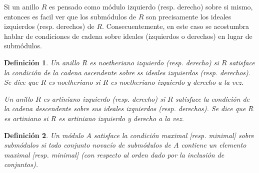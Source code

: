 \documentclass{report}
\newtheorem{definition}{Definición}
\begin{document}
  Si un anillo \(R\) es pensado como módulo izquierdo (resp. derecho) sobre si mismo, entonces es facil ver que los submódulos de \(R\) son precisamente los ideales izquierdos (resp. derechos) de \(R\).
  Consecuentemente, en este caso se acostumbra hablar de condiciones de cadena sobre ideales (izquierdos o derechos) en lugar de submódulos.

  \begin{definition}
    Un anillo \(R\) es \emph{noetheriano izquierdo} (resp. \emph{derecho}) si \(R\) satisface la condición de la cadena ascendente sobre ss ideales izquierdos (resp. derechos).
    Se dice que \(R\) es \emph{noetheriano} si \(R\) es noetheriano izquierdo y derecho a la vez.

    Un anillo \(R\) es \emph{artiniano izquierdo} (resp. \emph{derecho}) si \(R\) satisface la condición de la cadena descendente sobre sus ideales izquierdos (resp. derechos).
    Se dice que \(R\) es artiniano si \(R\) es artiniano izquierdo y derecho a la vez.
  \end{definition}

  \begin{definition}
    Un módulo \(A\) satisface la \emph{condición maximal} [resp. \emph{minimal}] \emph{sobre submódulos} si todo conjunto novacío de submódulos de \(A\) contiene un elemento maximal [resp. minimal] (con respecto al orden dado por la inclusión de conjuntos).
  \end{definition}
\end{document}
